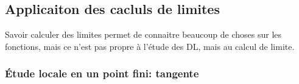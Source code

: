\documentclass[a4paper, 11pt]{article}
\begin{document}
{%
%
%
%
%
%
%
% 
%
%
%






\subsection{Applicaiton des cacluls de limites}

Savoir calculer des limites permet de connaitre beaucoup de choses sur les fonctions, mais ce n'est pas propre à l'étude des DL, mais au calcul de limite. 
\subsubsection{\'Etude locale en un point fini: tangente}
\setlength\fboxrule{1pt}
\noindent  { 

}}
\end{document}
